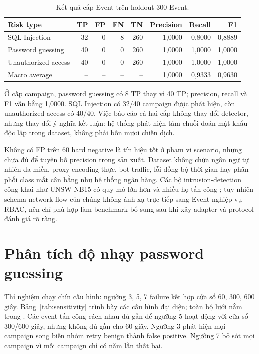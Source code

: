 \begin{table}[htbp]
\centering
\begin{tabular}{lrrrrrrr}
\toprule
Risk type & TP & FP & FN & TN & Precision & Recall & F1 \\
\midrule
SQL Injection & 32 & 0 & 8 & 260 & 1,0000 & 0,8000 & 0,8889 \\
Password guessing & 40 & 0 & 0 & 260 & 1,0000 & 1,0000 & 1,0000 \\
Unauthorized access & 40 & 0 & 0 & 260 & 1,0000 & 1,0000 & 1,0000 \\
Macro average & -- & -- & -- & -- & 1,0000 & 0,9333 & 0,9630 \\
\bottomrule
\end{tabular}
\caption{Kết quả cấp Event trên holdout 300 Event.}
\label{tab:holdout}
\end{table}

Ở cấp campaign, password guessing có 8 TP thay vì 40 TP; precision, recall và
F1 vẫn bằng 1,0000. SQL Injection có 32/40 campaign được phát hiện, còn
unauthorized access có 40/40. Việc báo cáo cả hai cấp không thay đổi detector,
nhưng thay đổi ý nghĩa kết luận: hệ thống phát hiện tám chuỗi đoán mật khẩu độc
lập trong dataset, không phải bốn mươi chiến dịch.

Không có FP trên 60 hard negative là tín hiệu tốt ở phạm vi scenario, nhưng
chưa đủ để tuyên bố precision trong sản xuất. Dataset không chứa ngôn ngữ tự
nhiên đa miền, proxy encoding thực, bot traffic, lỗi đồng bộ thời gian hay phân
phối class mất cân bằng như hệ thống ngân hàng. Các bộ intrusion-detection công
khai như UNSW-NB15 có quy mô lớn hơn và nhiều họ tấn công
\citep{UNSWNB15}; tuy nhiên schema network flow của chúng không ánh xạ trực
tiếp sang Event nghiệp vụ RBAC, nên chỉ phù hợp làm benchmark bổ sung sau khi
xây adapter và protocol đánh giá rõ ràng.

\section{Phân tích độ nhạy password guessing}

Thí nghiệm chạy chín cấu hình: ngưỡng 3, 5, 7 failure kết hợp cửa sổ 60, 300,
600 giây. Bảng~\ref{tab:sensitivity} trình bày các cấu hình đại diện; toàn bộ
lưới nằm trong . Các event tấn công
cách nhau đủ gần để ngưỡng 5 hoạt động với cửa sổ 300/600 giây, nhưng không đủ
gần cho 60 giây. Ngưỡng 3 phát hiện mọi campaign song biến nhóm retry benign
thành false positive. Ngưỡng 7 bỏ sót mọi campaign vì mỗi campaign chỉ có năm
lần thất bại.

